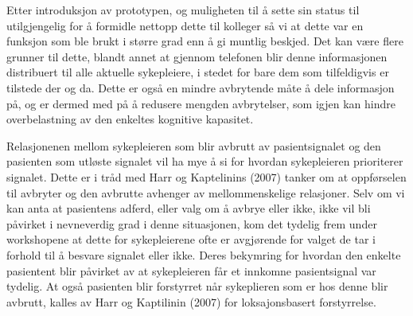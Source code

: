 \noindent
Etter introduksjon av prototypen, og muligheten til å sette sin status til utilgjengelig
for å formidle nettopp dette til kolleger så vi at dette var en funksjon som ble brukt
i større grad enn å gi muntlig beskjed. Det kan være flere grunner til dette, blandt annet at gjennom telefonen blir denne informasjonen distribuert til alle aktuelle sykepleiere, i stedet for bare dem som tilfeldigvis er tilstede der og da. Dette er også en mindre avbrytende måte å dele informasjon på, og er dermed med på å redusere mengden avbrytelser, som igjen kan hindre overbelastning av den enkeltes kognitive kapasitet. 

\noindent
Relasjonenen mellom sykepleieren som blir avbrutt av pasientsignalet og den pasienten som utløste signalet vil ha mye å si for hvordan sykepleieren prioriterer signalet. Dette er i tråd med Harr og Kaptelinins (2007) tanker om at oppførselen til avbryter og den avbrutte avhenger av mellommenskelige relasjoner. Selv om vi kan anta at pasientens adferd, eller valg om å avbrye eller ikke, ikke vil bli påvirket i nevneverdig grad i denne situasjonen, kom det tydelig frem under workshopene at dette for sykepleierene ofte er avgjørende for valget de tar i forhold til å besvare signalet eller ikke.  
Deres bekymring for hvordan den enkelte pasientent blir påvirket av at sykepleieren får et innkomne pasientsignal var tydelig. At også pasienten blir forstyrret når sykeplieren som er hos denne blir avbrutt, kalles av Harr og Kaptilinin (2007) for loksajonsbasert forstyrrelse. 